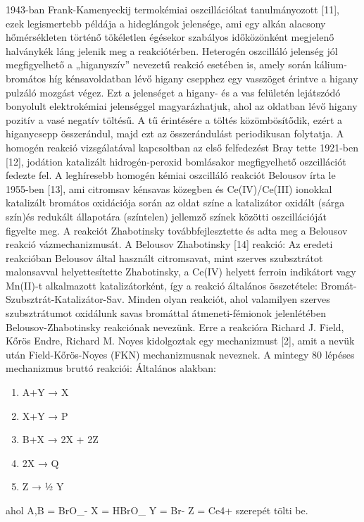1943-ban Frank-Kamenyeckij termokémiai oszcillációkat tanulmányozott [11], ezek legismertebb példája a hideglángok jelensége, ami egy alkán alacsony hőmérsékleten történő tökéletlen égésekor szabályos időközönként megjelenő halványkék láng jelenik meg a reakciótérben.
Heterogén oszcilláló jelenség jól megfigyelhető a „higanyszív” nevezetű reakció esetében is, amely során kálium-bromátos híg kénsavoldatban lévő higany csepphez egy vasszöget érintve a higany pulzáló mozgást végez. Ezt a jelenséget a higany- és a vas felületén lejátszódó bonyolult elektrokémiai jelenséggel magyarázhatjuk, ahol az oldatban lévő higany pozitív a vasé negatív töltésű. A tű érintésére a töltés közömbösítődik, ezért a higanycsepp összerándul, majd ezt az összerándulást periodikusan folytatja.
      A homogén reakció vizsgálatával kapcsoltban az első felfedezést Bray tette 1921-ben [12], jodátion katalizált hidrogén-peroxid bomlásakor megfigyelhető oszcillációt fedezte fel.
A leghíresebb homogén kémiai oszcilláló reakciót Belousov írta le 1955-ben [13], ami citromsav kénsavas közegben és Ce(IV)/Ce(III) ionokkal katalizált bromátos oxidációja során az oldat színe a katalizátor oxidált (sárga szín)és redukált állapotára (színtelen) jellemző színek közötti oszcillációját figyelte meg.
 A reakciót Zhabotinsky továbbfejlesztette és adta meg a Belousov reakció vázmechanizmusát.
A Belousov Zhabotinsky [14] reakció:
Az eredeti reakcióban Belousov által használt citromsavat, mint szerves szubsztrátot malonsavval helyettesítette Zhabotinsky, a Ce(IV) helyett ferroin indikátort vagy Mn(II)-t alkalmazott katalizátorként, így a reakció általános összetétele: Bromát-Szubsztrát-Katalizátor-Sav.
Minden olyan reakciót, ahol valamilyen szerves szubsztrátumot oxidálunk savas bromáttal átmeneti-fémionok jelenlétében Belousov-Zhabotinsky reakciónak nevezünk. Erre a reakcióra Richard J. Field, Kőrös Endre, Richard M. Noyes kidolgoztak egy mechanizmust [2], amit a nevük után Field-Kőrös-Noyes (FKN) mechanizmusnak neveznek. A mintegy 80 lépéses mechanizmus bruttó reakciói:
Általános alakban:

\begin{enumerate}
\item A+Y → X
\item X+Y → P
\item B+X → 2X + 2Z
\item 2X → Q
\item Z → ½ Y
\end{enumerate}

ahol 
A,B = BrO_-
X = HBrO_
Y = Br-
Z = Ce{4+} szerepét tölti be.

